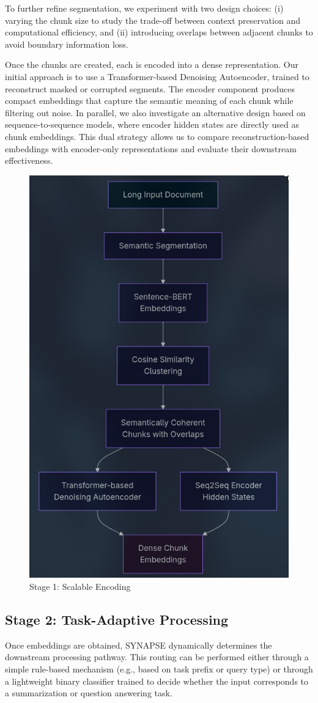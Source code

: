 \documentclass[11pt]{article}
\begin{document}
To further refine segmentation, we experiment with two design choices: (i) varying the chunk size to study the trade-off between context preservation and computational efficiency, and (ii) introducing overlaps between adjacent chunks to avoid boundary information loss.

Once the chunks are created, each is encoded into a dense representation. Our initial approach is to use a Transformer-based Denoising Autoencoder, trained to reconstruct masked or corrupted segments. The encoder component produces compact embeddings that capture the semantic meaning of each chunk while filtering out noise. In parallel, we also investigate an alternative design based on sequence-to-sequence models, where encoder hidden states are directly used as chunk embeddings. This dual strategy allows us to compare reconstruction-based embeddings with encoder-only representations and evaluate their downstream effectiveness.

\begin{figure}[H]
    \centering
    \includegraphics[width=0.6\columnwidth]{assets/Stage_1.jpeg}
    \caption*{Stage 1: Scalable Encoding}
    \label{fig:stage1}
\end{figure}

\subsection{Stage 2: Task-Adaptive Processing}
Once embeddings are obtained, SYNAPSE dynamically determines the downstream processing pathway. This routing can be performed either through a simple rule-based mechanism (e.g., based on task prefix or query type) or through a lightweight binary classifier trained to decide whether the input corresponds to a summarization or question answering task.
\end{document}
